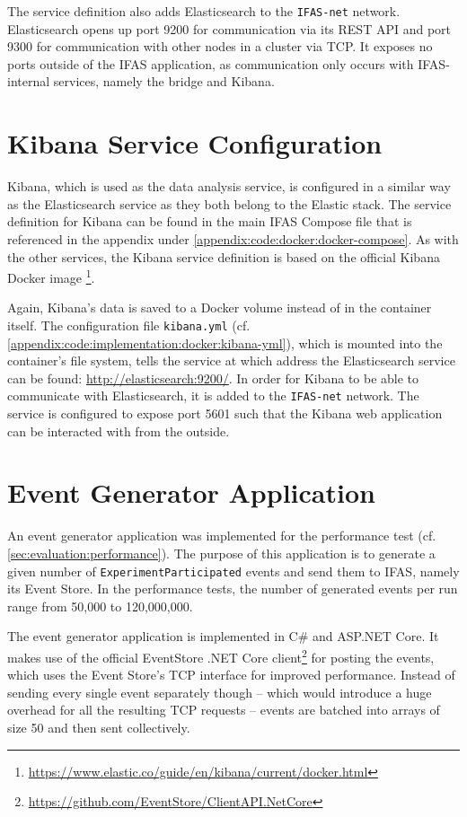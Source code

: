 The service definition also adds Elasticsearch to the \texttt{IFAS-net} network.
Elasticsearch opens up port 9200 for communication via its \ac{REST} \ac{API} and port 9300 for communication with other nodes in a cluster via \ac{TCP}.
It exposes no ports outside of the \ac{IFAS} application, as communication only occurs with \ac{IFAS}-internal services, namely the bridge and Kibana.

\section{Kibana Service Configuration}
\label{sec:implementation:analysis}

Kibana, which is used as the data analysis service, is configured in a similar way as the Elasticsearch service as they both belong to the Elastic stack.
The service definition for Kibana can be found in the main \ac{IFAS} Compose file that is referenced in the appendix under \cref{appendix:code:docker:docker-compose}.
As with the other services, the Kibana service definition is based on the official Kibana Docker image \footnote{\url{https://www.elastic.co/guide/en/kibana/current/docker.html}}.

Again, Kibana's data is saved to a Docker volume instead of in the container itself.
The configuration file \texttt{kibana.yml} (cf. \cref{appendix:code:implementation:docker:kibana-yml}), which is mounted into the container's file system, tells the service at which address the Elasticsearch service can be found: \url{http://elasticsearch:9200/}.
In order for Kibana to be able to communicate with Elasticsearch, it is added to the \texttt{IFAS-net} network.
The service is configured to expose port 5601 such that the Kibana web application can be interacted with from the outside.

\section{Event Generator Application}
\label{sec:implementation:event-generator}

An event generator application was implemented for the performance test (cf. \cref{sec:evaluation:performance}).
The purpose of this application is to generate a given number of \texttt{ExperimentParticipated} events and send them to \ac{IFAS}, namely its Event Store.
In the performance tests, the number of generated events per run range from 50,000 to 120,000,000.

The event generator application is implemented in C\# and ASP.NET Core.
It makes use of the official EventStore .NET Core client\footnote{\url{https://github.com/EventStore/ClientAPI.NetCore}} for posting the events, which uses the Event Store's \ac{TCP} interface for improved performance.
Instead of sending every single event separately though -- which would introduce a huge overhead for all the resulting \ac{TCP} requests -- events are batched into arrays of size 50 and then sent collectively.


